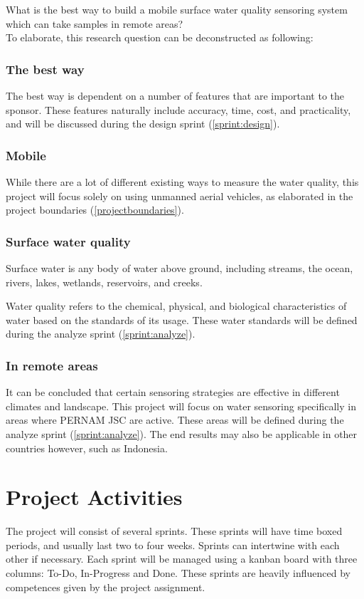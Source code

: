\documentclass[11pt, a4paper]{article}
\begin{document}
\large{What is the best way to build a mobile surface water quality sensoring system which can take samples in remote areas?}\vspace{3mm}\\
\normalsize
To elaborate, this research question can be deconstructed as following:

\subsubsection{The best way}
The best way is dependent on a number of features that are important to the sponsor. These features naturally include accuracy, time, cost, and practicality, and will be discussed during the design sprint (\ref{sprint:design}).

\subsubsection{Mobile}
While there are a lot of different existing ways to measure the water quality, this project will focus solely on using unmanned aerial vehicles, as elaborated in the project boundaries (\ref{projectboundaries}).

\subsubsection{Surface water quality}
Surface water is any body of water above ground, including streams, the ocean, rivers, lakes, wetlands, reservoirs, and creeks.\cite{surfacewater}

Water quality refers to the chemical, physical, and biological characteristics of water based on the standards of its usage. These water standards will be defined during the analyze sprint (\ref{sprint:analyze}).

\subsubsection{In remote areas}
It can be concluded that certain sensoring strategies are effective in different climates and landscape. This project will focus on water sensoring specifically in areas where PERNAM JSC are active. These areas will be defined during the analyze sprint (\ref{sprint:analyze}). The end results may also be applicable in other countries however, such as Indonesia.



\section{Project Activities} \label{projectactivities}
The project will consist of several sprints. These sprints will have time boxed periods, and usually last two to four weeks. Sprints can intertwine with each other if necessary. Each sprint will be managed using a kanban \cite{kanban} board with three columns: To-Do, In-Progress and Done. These sprints are heavily influenced by competences given by the project assignment. \cite{assignmentform}
\end{document}
